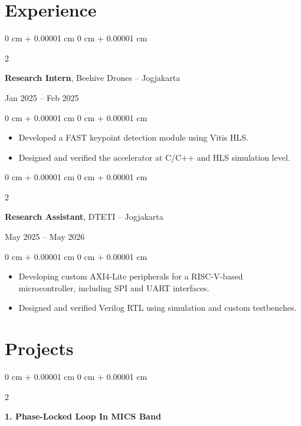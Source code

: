 \documentclass[10pt, letterpaper]{article}
\newenvironment{highlights}{
    \begin{itemize}[
        topsep=0.10 cm,
        parsep=0.10 cm,
        partopsep=0pt,
        itemsep=0pt,
        leftmargin=0 cm + 10pt
    ]
}{
    \end{itemize}
} %
\newenvironment{onecolentry}{
    \begin{adjustwidth}{
        0 cm + 0.00001 cm
    }{
        0 cm + 0.00001 cm
    }
}{
    \end{adjustwidth}
} %
\newenvironment{twocolentry}[2][]{
    \onecolentry
    \def\secondColumn{#2}
    \setcolumnwidth{\fill, 4.5 cm}
    \begin{paracol}{2}
}{
    \switchcolumn \raggedleft \secondColumn
    \end{paracol}
    \endonecolentry
} %
\begin{document}
    
\section{Experience}

    \begin{twocolentry}{
        Jan 2025 – Feb 2025
    }
        \textbf{Research Intern}, Beehive Drones -- Jogjakarta
    \end{twocolentry}
    
    \vspace{0.1 cm}
    
    \begin{onecolentry}
        \begin{highlights}
            \item Developed a FAST keypoint detection module using Vitis HLS.  
            \item Designed and verified the accelerator at C/C++ and HLS simulation level.  
        \end{highlights}
    \end{onecolentry}
    
    \vspace{0.2 cm}
    
    \begin{twocolentry}{
        May 2025 – May 2026
    }
        \textbf{Research Assistant}, DTETI -- Jogjakarta
    \end{twocolentry}
    
    \vspace{0.10 cm}
    
    \begin{onecolentry}
        \begin{highlights}
            \item Developing custom AXI4-Lite peripherals for a RISC-V-based microcontroller, including SPI and UART interfaces.
            \item Designed and verified Verilog RTL using simulation and custom testbenches.
        \end{highlights}
    \end{onecolentry}
        
        
    \section{Projects}
            
    \begin{twocolentry}{}
        \textbf{1. Phase-Locked Loop In MICS Band}
    \end{twocolentry}
    
\end{document}
